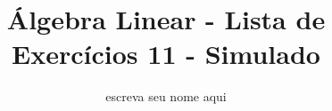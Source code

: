 \documentclass[leqno]{article}
\numberwithin{equation}{section}
\begin{document}
\newtheorem{teo}{Teorema}[section] \newtheorem*{teo*}{Teorema}
\newtheorem{prop}[teo]{Proposição} \newtheorem*{prop*}{Proposição}
\newtheorem{lema}[teo]{Lemma} \newtheorem*{lema*}{Lema}
\newtheorem{cor}[teo]{Corolário} \newtheorem*{cor*}{Corolário}

\theoremstyle{definition}
\newtheorem{defi}[teo]{Definição} \newtheorem*{defi*}{Definição}
\newtheorem{exem}[teo]{Exemplo} \newtheorem*{exem*}{Exemplo}
\newtheorem{obs}[teo]{Observação} \newtheorem*{obs*}{Observação}
\newtheorem*{hipo}{Hipóteses}
\newtheorem*{nota}{Notação}

\newcommand{\ds}{\displaystyle} \newcommand{\nl}{\newline}
\newcommand{\eps}{\varepsilon} \newcommand{\ssty}{\scriptstyle}
\newcommand{\bE}{\mathbb{E}}
\newcommand{\cB}{\mathcal{B}}
\newcommand{\cF}{\mathcal{F}}
\newcommand{\cA}{\mathcal{A}}
\newcommand{\cM}{\mathcal{M}}
\newcommand{\cD}{\mathcal{D}}
\newcommand{\cN}{\mathcal{N}}
\newcommand{\cL}{\mathcal{L}}
\newcommand{\cLN}{\mathcal{LN}}
\newcommand{\bP}{\mathbb{P}}
\newcommand{\bQ}{\mathbb{Q}}
\newcommand{\bN}{\mathbb{N}}
\newcommand{\bR}{\mathbb{R}}
\newcommand{\bZ}{\mathbb{Z}}

\newcommand{\bfw}{\mathbf{w}}
\newcommand{\bfv}{\mathbf{v}}
\newcommand{\bfu}{\mathbf{u}}
\newcommand{\bfx}{\mathbf{x}}
\newcommand{\bfb}{\mathbf{b}}

\newcommand{\bvecc}[2]{%
  \begin{bmatrix} #1 \\ #2  \end{bmatrix}
}
\newcommand{\bveccc}[3]{%
  \begin{bmatrix} #1 \\ #2 \\ #3  \end{bmatrix}
}


\title{Álgebra Linear - Lista de Exercícios 11 - Simulado}

\author{escreva seu nome aqui} 

\date{}

\maketitle
\end{document}
